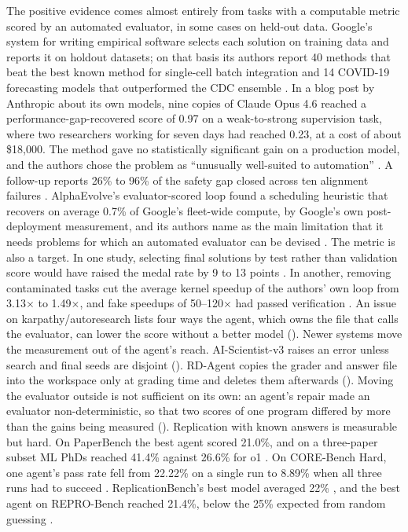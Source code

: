 The positive evidence comes almost entirely from tasks with a computable metric scored by an automated evaluator, in some cases on held-out data. Google's system for writing empirical software selects each solution on training data and reports it on holdout datasets; on that basis its authors report 40 methods that beat the best known method for single-cell batch integration and 14 COVID-19 forecasting models that outperformed the CDC ensemble \citep{S31}. In a blog post by Anthropic about its own models, nine copies of Claude Opus 4.6 reached a performance-gap-recovered score of 0.97 on a weak-to-strong supervision task, where two researchers working for seven days had reached 0.23, at a cost of about \$18,000. The method gave no statistically significant gain on a production model, and the authors chose the problem as ``unusually well-suited to automation'' \citep{S20}. A follow-up reports 26\% to 96\% of the safety gap closed across ten alignment failures \citep{S21}. AlphaEvolve's evaluator-scored loop found a scheduling heuristic that recovers on average 0.7\% of Google's fleet-wide compute, by Google's own post-deployment measurement, and its authors name as the main limitation that it needs problems for which an automated evaluator can be devised \citep{A25}. The metric is also a target. In one study, selecting final solutions by test rather than validation score would have raised the medal rate by 9 to 13 points \citep{R26}. In another, removing contaminated tasks cut the average kernel speedup of the authors' own loop from 3.13$\times$ to 1.49$\times$, and fake speedups of 50--120$\times$ had passed verification \citep{S28}. An issue on karpathy/autoresearch lists four ways the agent, which owns the file that calls the evaluator, can lower the score without a better model (). Newer systems move the measurement out of the agent's reach. AI-Scientist-v3 raises an error unless search and final seeds are disjoint (). RD-Agent copies the grader and answer file into the workspace only at grading time and deletes them afterwards (). Moving the evaluator outside is not sufficient on its own: an agent's repair made an evaluator non-deterministic, so that two scores of one program differed by more than the gains being measured (). Replication with known answers is measurable but hard. On PaperBench the best agent scored 21.0\%, and on a three-paper subset ML PhDs reached 41.4\% against 26.6\% for o1 \citep{S7}. On CORE-Bench Hard, one agent's pass rate fell from 22.22\% on a single run to 8.89\% when all three runs had to succeed \citep{S8}. ReplicationBench's best model averaged 22\% \citep{S26}, and the best agent on REPRO-Bench reached 21.4\%, below the 25\% expected from random guessing \citep{S32}.

